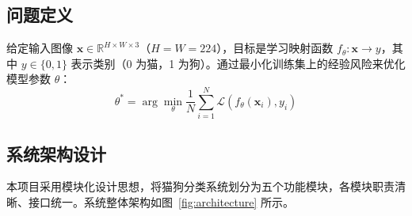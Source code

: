 \documentclass[12pt,a4paper]{ctexart}
\begin{document}
\subsection{问题定义}

给定输入图像 $\mathbf{x} \in \mathbb{R}^{H \times W \times 3}$（$H=W=224$），目标是学习映射函数 $f_\theta: \mathbf{x} \rightarrow y$，其中 $y \in \{0, 1\}$ 表示类别（0 为猫，1 为狗）。通过最小化训练集上的经验风险来优化模型参数 $\theta$：
\begin{equation}
    \theta^* = \arg\min_\theta \frac{1}{N} \sum_{i=1}^{N} \mathcal{L}(f_\theta(\mathbf{x}_i), y_i)
\end{equation}

\subsection{系统架构设计}

本项目采用模块化设计思想，将猫狗分类系统划分为五个功能模块，各模块职责清晰、接口统一。系统整体架构如图~\ref{fig:architecture} 所示。
\end{document}
